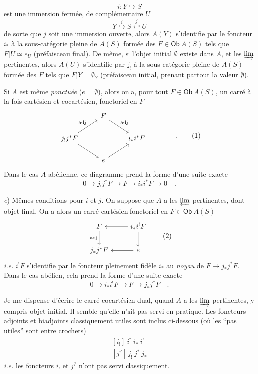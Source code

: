\documentclass[11pt]{article}
\newcommand{\printedpage}[1]{\marginpar{\footnotesize p.~#1}}
\newcommand{\msp}[1]{\marginpar{\footnotesize [#1]}}
\newcommand{\Ob}{\mathsf{Ob}}
\begin{document}
\msp{page 2}
\[
i : Y \hookrightarrow S
\]
est une immersion fermée, de complémentaire $U$
\[
Y \overset{i}{\hookrightarrow} S \overset{j}{\hookleftarrow} U
\]
de sorte que $j$ soit une immersion ouverte, alors $A(Y)$ s'identifie par le foncteur $i_{*}$ à la sous-catégorie pleine de $A(S)$ formée des $F \in \Ob\ A(S)$ tels que $F|U \simeq e_{U}$ (préfaisceau final). De même, si l'objet initial $\emptyset$ existe dans $A$, et les $\varinjlim$ pertinentes, alors $A(U)$ s'identifie par $j_{!}$ à la sous-catégorie pleine de $A(S)$ formée des $F$ tels que $F|Y=\emptyset_{Y}$ (préfaisceau initial, prenant partout la valeur $\emptyset$).

Si $A$ est même \textit{ponctuée} ($e=\emptyset$), alors on a, pour tout $F\in \Ob\ A(S)$, un carré à la fois cartésien et cocartésien, fonctoriel en $F$
\[
\begin{tikzcd}
 & F \arrow[dr, "\text{adj}"] & \\
j_{!}j^{*}F \arrow[ur, "\text{adj}"] \arrow[dr] & & i_{*}i^{*}F \\
 & e \arrow[ur] &
\end{tikzcd}
\qquad\qquad \text{.}
\tag*{(1)}
\]
Dans le cas $A$ abélienne, ce diagramme prend la forme d'une suite exacte
\[
0 \longrightarrow j_{!}j^{*}F \longrightarrow F \longrightarrow i_{*}i^{*}F \longrightarrow 0 \quad .
\]

\textit{e}) Mêmes conditions pour $i$ et $j$. On suppose que $A$ a les $\varprojlim$ pertinentes, dont objet final. On a alors un carré cartésien fonctoriel en $F\in \Ob\ A(S)$
\[
\begin{tikzcd}
F \arrow[d, "\text{adj}"'] & i_{*}i^{!}F \arrow[l] \arrow[d] \\
j_{*}j^{*}F & e \arrow[l]
\end{tikzcd}
\tag*{(2)}
\]
\textit{i.e.} $i^{!}F$ s'identifie par le foncteur pleinement fidèle $i_{*}$ au \textit{noyau} de $F\to j_{*}j^{*}F$. Dans le cas abélien, cela prend la forme d'une suite exacte
\[
0 \longrightarrow i_{*}i^{!}F \longrightarrow F \longrightarrow j_{*}j^{*}F \quad .
\]

\clearpage

\printedpage{3}

\msp{page 3}

Je me dispense d'écrire le carré cocartésien dual, quand $A$ a les $\varinjlim$ pertinentes, y compris objet initial. Il semble qu'elle n'ait pas servi en pratique. Les foncteurs adjoints et biadjoints classiquement utiles sont inclus ci-dessous (où les “pas utiles” sont entre crochets)
\[
\begin{aligned}
{}[i_{!}]\ i^{*}\ i_{*}\ i^{!} \\
[j^{?}]\ j_{!}\ j^{*}\ j_{*}
\end{aligned}
\]
\textit{i.e.} les foncteurs $i_{!}$ et $j^{?}$ n'ont pas servi classiquement.
\end{document}
